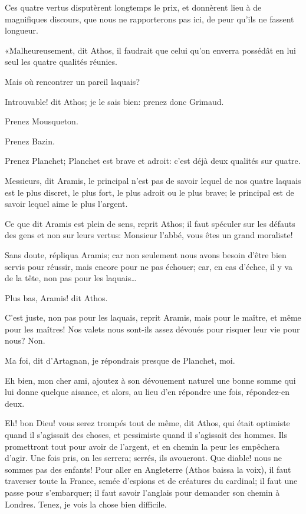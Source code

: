 Ces quatre vertus disputèrent longtemps le prix, et donnèrent lieu à de magnifiques discours, que nous ne rapporterons pas ici, de peur qu'ils ne fassent longueur. 

«Malheureusement, dit Athos, il faudrait que celui qu'on enverra possédât en lui seul les quatre qualités réunies. 

\speak  Mais où rencontrer un pareil laquais? 

\speak  Introuvable! dit Athos; je le sais bien: prenez donc Grimaud. 

\speak  Prenez Mousqueton. 

\speak  Prenez Bazin. 

\speak  Prenez Planchet; Planchet est brave et adroit: c'est déjà deux qualités sur quatre. 

\speak  Messieurs, dit Aramis, le principal n'est pas de savoir lequel de nos quatre laquais est le plus discret, le plus fort, le plus adroit ou le plus brave; le principal est de savoir lequel aime le plus l'argent. 

\speak  Ce que dit Aramis est plein de sens, reprit Athos; il faut spéculer sur les défauts des gens et non sur leurs vertus: Monsieur l'abbé, vous êtes un grand moraliste! 

\speak  Sans doute, répliqua Aramis; car non seulement nous avons besoin d'être bien servis pour réussir, mais encore pour ne pas échouer; car, en cas d'échec, il y va de la tête, non pas pour les laquais\dots 

\speak  Plus bas, Aramis! dit Athos. 

\speak  C'est juste, non pas pour les laquais, reprit Aramis, mais pour le maître, et même pour les maîtres! Nos valets nous sont-ils assez dévoués pour risquer leur vie pour nous? Non. 

\speak  Ma foi, dit d'Artagnan, je répondrais presque de Planchet, moi. 

\speak  Eh bien, mon cher ami, ajoutez à son dévouement naturel une bonne somme qui lui donne quelque aisance, et alors, au lieu d'en répondre une fois, répondez-en deux. 

\speak  Eh! bon Dieu! vous serez trompés tout de même, dit Athos, qui était optimiste quand il s'agissait des choses, et pessimiste quand il s'agissait des hommes. Ils promettront tout pour avoir de l'argent, et en chemin la peur les empêchera d'agir. Une fois pris, on les serrera; serrés, ils avoueront. Que diable! nous ne sommes pas des enfants! Pour aller en Angleterre (Athos baissa la voix), il faut traverser toute la France, semée d'espions et de créatures du cardinal; il faut une passe pour s'embarquer; il faut savoir l'anglais pour demander son chemin à Londres. Tenez, je vois la chose bien difficile. 

